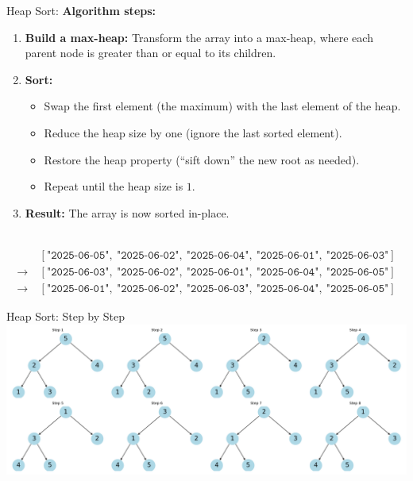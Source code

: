 \documentclass[aspectratio=169]{beamer}
\begin{document}
\begin{frame}{Heap Sort:}
  \textbf{Algorithm steps:}
  \begin{enumerate}
    \item \textbf{Build a max-heap:}
      Transform the array into a max-heap, where each parent node is greater than or equal to its children.
    \item \textbf{Sort:}
      \begin{itemize}
        \item Swap the first element (the maximum) with the last element of the heap.
        \item Reduce the heap size by one (ignore the last sorted element).
        \item Restore the heap property (“sift down” the new root as needed).
        \item Repeat until the heap size is $1$.
      \end{itemize}
    \item \textbf{Result:} The array is now sorted in-place.
  \end{enumerate}\\

  \[
  \begin{aligned}
    &[\texttt{"2025-06-05"},\ \texttt{"2025-06-02"},\ \texttt{"2025-06-04"},\ \texttt{"2025-06-01"},\ \texttt{"2025-06-03"}]\\
    \to\ &[ \texttt{"2025-06-03"},\ \texttt{"2025-06-02"},\ \texttt{"2025-06-01"},\ \texttt{"2025-06-04"},\ \texttt{"2025-06-05"}]\\
    \to\ &[ \texttt{"2025-06-01"},\ \texttt{"2025-06-02"},\ \texttt{"2025-06-03"},\ \texttt{"2025-06-04"},\ \texttt{"2025-06-05"}]
  \end{aligned}
\]
\end{frame}

\begin{frame}{Heap Sort: Step by Step}
  \hspace*{-1cm}
\includegraphics[width=1.1\linewidth]{graphs/heap_sort_comics.png}
\end{frame}
\end{document}
